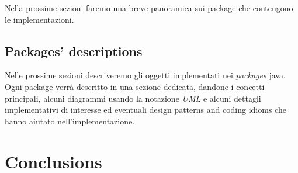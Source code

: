 \documentclass[twoside,openright,titlepage,fleqn,
	headinclude,11pt,a4paper,BCOR5mm,footinclude
	]{scrbook}
\begin{document}




Nella prossime sezioni faremo una breve panoramica sui package che
contengono le implementazioni.

\section{Packages' descriptions}
\label{section:packages-descriptions}

Nelle prossime sezioni descriveremo gli oggetti implementati nei
\emph{packages} java. Ogni package verr\`a descritto in una sezione
dedicata, dandone i concetti principali, alcuni diagrammi usando la
notazione \emph{UML} e alcuni dettagli implementativi di interesse ed
eventuali design patterns and coding idioms che hanno aiutato
nell'implementazione.







% 

\chapter{Conclusions}
\label{chapter:conclusions}





% 
% 
\end{document}
